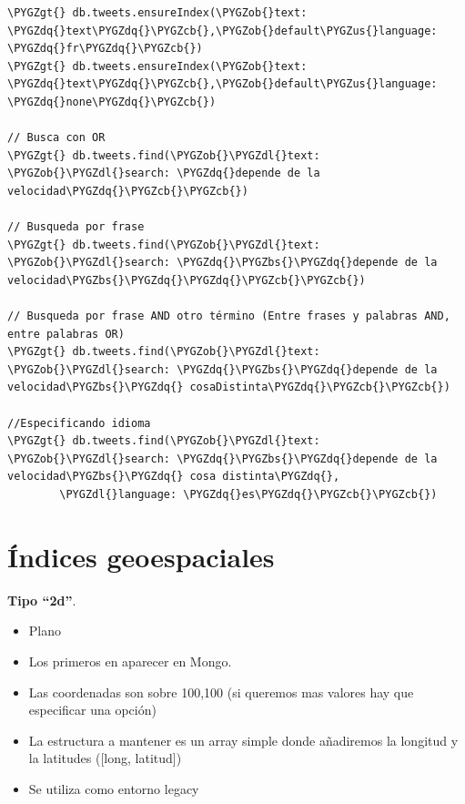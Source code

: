 \documentclass[a4paper,10pt,english]{sphinxmanual}
\def\PYGZbs{\char`\\}
\def\PYGZus{\char`\_}
\def\PYGZob{\char`\{}
\def\PYGZcb{\char`\}}
\def\PYGZgt{\char`\>}
\def\PYGZdl{\char`\$}
\def\PYGZdq{\char`\"}
\begin{document}
\begin{Verbatim}[commandchars=\\\{\}]
\PYGZgt{} db.tweets.ensureIndex(\PYGZob{}text: \PYGZdq{}text\PYGZdq{}\PYGZcb{},\PYGZob{}default\PYGZus{}language: \PYGZdq{}fr\PYGZdq{}\PYGZcb{})
\PYGZgt{} db.tweets.ensureIndex(\PYGZob{}text: \PYGZdq{}text\PYGZdq{}\PYGZcb{},\PYGZob{}default\PYGZus{}language: \PYGZdq{}none\PYGZdq{}\PYGZcb{})

// Busca con OR
\PYGZgt{} db.tweets.find(\PYGZob{}\PYGZdl{}text: \PYGZob{}\PYGZdl{}search: \PYGZdq{}depende de la velocidad\PYGZdq{}\PYGZcb{}\PYGZcb{})

// Busqueda por frase
\PYGZgt{} db.tweets.find(\PYGZob{}\PYGZdl{}text: \PYGZob{}\PYGZdl{}search: \PYGZdq{}\PYGZbs{}\PYGZdq{}depende de la velocidad\PYGZbs{}\PYGZdq{}\PYGZdq{}\PYGZcb{}\PYGZcb{})

// Busqueda por frase AND otro término (Entre frases y palabras AND, entre palabras OR)
\PYGZgt{} db.tweets.find(\PYGZob{}\PYGZdl{}text: \PYGZob{}\PYGZdl{}search: \PYGZdq{}\PYGZbs{}\PYGZdq{}depende de la velocidad\PYGZbs{}\PYGZdq{} cosaDistinta\PYGZdq{}\PYGZcb{}\PYGZcb{})

//Especificando idioma
\PYGZgt{} db.tweets.find(\PYGZob{}\PYGZdl{}text: \PYGZob{}\PYGZdl{}search: \PYGZdq{}\PYGZbs{}\PYGZdq{}depende de la velocidad\PYGZbs{}\PYGZdq{} cosa distinta\PYGZdq{},
        \PYGZdl{}language: \PYGZdq{}es\PYGZdq{}\PYGZcb{}\PYGZcb{})
\end{Verbatim}


\section{Índices geoespaciales}
\label{contents/optimizing:indices-geoespaciales}
\textbf{Tipo ``2d''}.
\begin{itemize}
\item {} 
Plano

\item {} 
Los primeros en aparecer en Mongo.

\item {} 
Las coordenadas son sobre 100,100 (si queremos mas valores hay que especificar una opción)

\item {} 
La estructura a mantener es un array simple donde añadiremos la longitud y la latitudes ({[}long, latitud{]})

\item {} 
Se utiliza como entorno legacy

\end{itemize}
\end{document}
